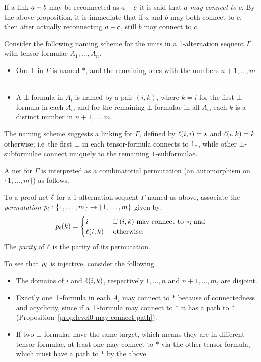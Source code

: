 \documentclass[conference]{IEEEtran}
\begin{document}
If a link $a-b$ may be reconnected as $a-c$ it is said that $a$ \emph{may connect to} $c$. 
%
By the above proposition, it is immediate that if $a$ and $b$ may both connect to $c$, then after actually reconnecting $a-c$, still $b$ may connect to $c$.



Consider the following naming scheme for the units in a 1-alternation sequent $\Gamma$ with tensor-formulae $A_1,\dotsc,A_n$.
%
\begin{itemize}

	\item
One $1$ in $\Gamma$ is named $*$, and the remaining ones with the numbers $n+1,\dotsc,m$.

	\item
A $\bot$-formula in $A_i$ is named by a pair $(i,k)$, where $k=i$ for the first $\bot$-formula in each $A_i$, and for the remaining $\bot$-formulae in all $A_i$, each $k$ is a distinct number in $n+1,\dotsc,m$.

\end{itemize}
%
The naming scheme suggests a linking for $\Gamma$, defined by $\ell(i,i)=\star$ and $\ell(i,k)=k$ otherwise; i.e\ the first $\bot$ in each tensor-formula connects to $1_{*}$, while other $\bot$-subformulae connect uniquely to the remaining $1$-subformulae.



A net for $\Gamma$ is interpreted as a combinatorial permutation (an automorphism on $\{1,\dotsc,m\}$) as follows.
%
\begin{definition}
\label{def:combinatorial permutation}
To a proof net $\ell$ for a 1-alternation sequent $\Gamma$ named as above, associate the \emph{permutation} $\mathit p_{\ell}:\{1,\dotsc,m\}\to\{1,\dotsc,m\}$ given by:
\[
	\mathit p_{\ell}(k) = 
	\begin{cases}
		i				& \text{ if $(i,k)$ may connect to $*$; and}
	\\	\ell(i,k)		& \text{ otherwise.}
	\end{cases}
\]
The \emph{parity} of $\ell$ is the parity of its permutation.
\end{definition}


To see that $\mathit p_{\ell}$ is injective, consider the following.
\begin{itemize}
	\item The domains of $i$ and $\ell(i,k)$, respectively $1,\dotsc,n$ and $n+1,\dotsc,m$, are disjoint.
	\item Exactly one $\bot$-formula in each $A_i$ may connect to $*$ because of connectedness and acyclicity, since if a $\bot$-formula may connect to $*$ it has a path to $*$ (Proposition~\ref{prop:level0 may-connect path}).
	\item If two $\bot$-formulae have the same target, which means they are in different tensor-formulae, at least one may connect to $*$ via the other tensor-formula, which must have a path to $*$ by the above.
\end{itemize}
\end{document}
